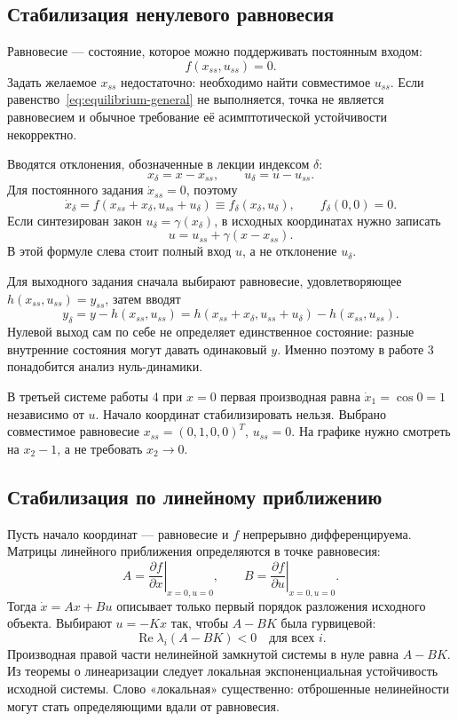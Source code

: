 \subsection{Стабилизация ненулевого равновесия}

Равновесие --- состояние, которое можно поддерживать постоянным входом:
\begin{equation}
  f(x_{ss},u_{ss})=0.
  \label{eq:equilibrium-general}
\end{equation}
Задать желаемое $x_{ss}$ недостаточно: необходимо найти совместимое $u_{ss}$.
Если равенство~\eqref{eq:equilibrium-general} не выполняется, точка не является
равновесием и обычное требование её асимптотической устойчивости некорректно.

Вводятся отклонения, обозначенные в лекции индексом $\delta$:
\[
  x_\delta=x-x_{ss},\qquad u_\delta=u-u_{ss}.
\]
Для постоянного задания $\dot x_{ss}=0$, поэтому
\[
  \dot x_\delta=f(x_{ss}+x_\delta,u_{ss}+u_\delta)
  \equiv f_\delta(x_\delta,u_\delta),\qquad f_\delta(0,0)=0.
\]
Если синтезирован закон $u_\delta=\gamma(x_\delta)$, в исходных координатах
нужно записать
\begin{equation}
  u=u_{ss}+\gamma(x-x_{ss}).
  \label{eq:equilibrium-feedback}
\end{equation}
В этой формуле слева стоит полный вход $u$, а не отклонение $u_\delta$.

Для выходного задания сначала выбирают равновесие, удовлетворяющее
$h(x_{ss},u_{ss})=y_{ss}$, затем вводят
\[
  y_\delta=y-h(x_{ss},u_{ss})
  =h(x_{ss}+x_\delta,u_{ss}+u_\delta)-h(x_{ss},u_{ss}).
\]
Нулевой выход сам по себе не определяет единственное состояние:
разные внутренние состояния могут давать одинаковый $y$. Именно поэтому
в работе 3 понадобится анализ нуль-динамики.

\addition В третьей системе работы 4 при $x=0$ первая производная равна
$\dot x_1=\cos0=1$ независимо от $u$. Начало координат стабилизировать нельзя.
Выбрано совместимое равновесие $x_{ss}=(0,1,0,0)^T$, $u_{ss}=0$.
На графике нужно смотреть на $x_2-1$, а не требовать $x_2\to0$.

\subsection{Стабилизация по линейному приближению}

Пусть начало координат --- равновесие и $f$ непрерывно дифференцируема.
Матрицы линейного приближения определяются в точке равновесия:
\[
  A=\left.\frac{\partial f}{\partial x}\right|_{x=0,u=0},\qquad
  B=\left.\frac{\partial f}{\partial u}\right|_{x=0,u=0}.
\]
Тогда $\dot x=Ax+Bu$ описывает только первый порядок разложения исходного
объекта. Выбирают $u=-Kx$ так, чтобы $A-BK$ была гурвицевой:
\[
  \operatorname{Re}\lambda_i(A-BK)<0\quad\text{для всех }i.
\]
Производная правой части нелинейной замкнутой системы в нуле равна $A-BK$.
Из теоремы о линеаризации следует локальная экспоненциальная устойчивость
исходной системы. Слово «локальная» существенно: отброшенные нелинейности
могут стать определяющими вдали от равновесия.

